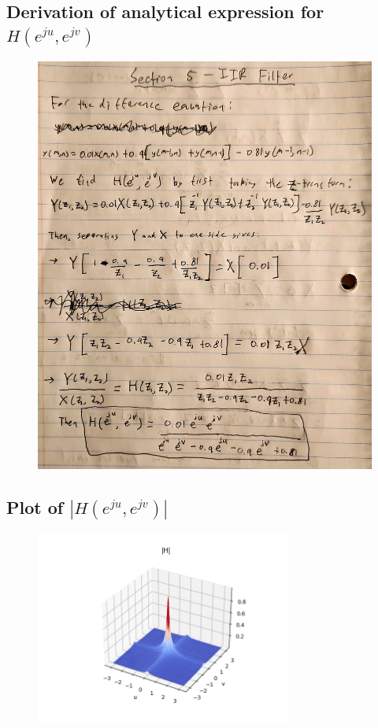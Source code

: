 \documentclass{article}
\begin{document}
\subsection{Derivation of analytical expression for $H(e^{ju}, e^{jv})$}
\begin{figure}[H]
    \centering
    \includegraphics[width=1\textwidth]{../results/ece637-lab1_3.jpg}
    \begin{center}
    \end{center}
\end{figure}
\subsection{Plot of $|H(e^{ju}, e^{jv})|$}
\begin{figure}[H]
    \centering
    \includegraphics[width=0.75\textwidth]{../results/section5-python.png}
    \begin{center}
    \end{center}
\end{figure}
\end{document}

